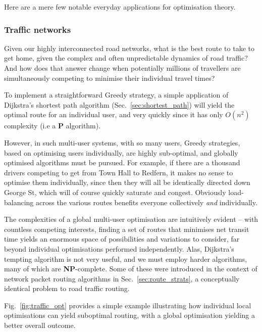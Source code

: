 Here are a mere few notable everyday applications for optimisation theory.

\subsubsection{Traffic networks}

Given our highly interconnected road networks, what is the best route to take to get home, given the  complex and often unpredictable dynamics of road traffic? And how does that answer change when potentially millions of travellers are simultaneously competing to minimise their individual travel times?

To implement a straightforward {\sc Greedy} strategy, a simple application of Dijkstra's shortest path algorithm (Sec.~\ref{sec:shortest_path}) will yield the optimal route for an individual user, and very quickly since it has only $O(n^2)$ complexity (i.e a \textbf{P} algorithm).

However, in such multi-user systems, with so many users, {\sc Greedy} strategies, based on optimising users individually, are highly sub-optimal, and globally optimised algorithms must be pursued. For example, if there are a thousand drivers competing to get from Town Hall to Redfern, it makes no sense to optimise them individually, since then they will all be identically directed down George St, which will of course quickly saturate and congest. Obviously load-balancing across the various routes benefits everyone collectively \textit{and} individually.

The complexities of a global multi-user optimisation are intuitively evident -- with countless competing interests, finding a set of routes that minimises net transit time yields an enormous space of possibilities and variations to consider, far beyond individual optimisations performed independently. Alas, Dijkstra's tempting algorithm is not very useful, and we must employ harder algorithms, many of which are \textbf{NP}-complete. Some of these were introduced in the context of network packet routing algorithms in Sec.~\ref{sec:route_strats}, a conceptually identical problem to road traffic routing.

Fig.~\ref{fig:traffic_opt} provides a simple example illustrating how individual local optimisations can yield suboptimal routing, with a global optimisation yielding a better overall outcome.

